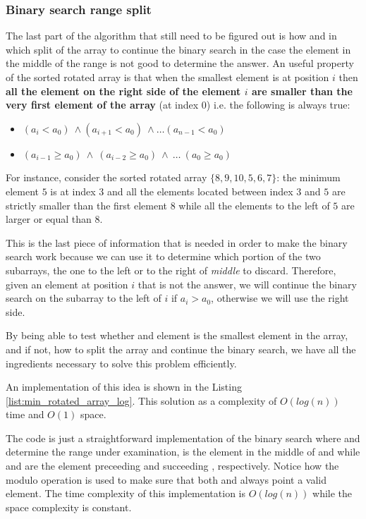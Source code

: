 \subsubsection{Binary search range split}
The last part of the algorithm that still need to be figured out is how and in which split of the array to continue the binary search in the case the element in the middle of the range is not good to determine the answer. An useful property of the sorted rotated array is that when the smallest element is at position $i$ then \textbf{all the element on the right side of the element $i$ are smaller than the very first element of the array }(at index $0$) i.e. the following is always true:
\begin{itemize}
	\item $	(a_i < a_0) \: \wedge (a_{i+1} < a_0) \: \wedge \ldots (a_{n-1} < a_0) $
	\item $	(a_{i-1} \geq a_0) \: \wedge \: (a_{i-2} \geq a_0) \: \wedge \: \ldots \: (a_{0} \geq a_0) $
\end{itemize}
For instance, consider the sorted rotated array $\{8,9,10,5,6,7\}$: the minimum element $5$ is at index $3$ and all the elements located between index $3$ and $5$ are strictly smaller than the first element $8$ while all the elements to the left of $5$ are larger or equal than $8$.

This is the last piece of information that is needed in order to make the binary search work because we can use it to determine which portion of the two subarrays, the one to the left or to the right of \textit{middle} to discard. Therefore, given an element at position $i$ that is not the answer, we will continue the binary search on the subarray to the left of $i$ if $a_i > a_0$, otherwise we will use the right side.

By being able to test whether and element is the smallest element in the array, and if not, how to split the array and continue the binary search, we have all the ingredients necessary to solve this problem efficiently.

An implementation of this idea is shown in the Listing \ref{list:min_rotated_array_log}. This solution as a complexity of $O(log(n))$ time and $O(1)$ space.



The code is just a straightforward implementation of the binary search where  and  determine the range under examination,  is the element in the middle of  and  while  and  are the element preceeding and succeeding , respectively. Notice how the modulo operation is used to make sure that both  and  always point a valid element. The time complexity of this implementation is $O(log(n))$ while the space complexity is constant. 